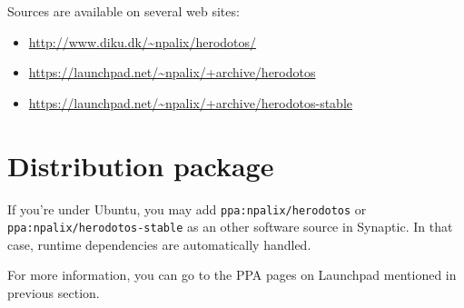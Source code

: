 Sources are available on several web sites:
\begin{itemize}
\item \url{http://www.diku.dk/~npalix/herodotos/}
\item \url{https://launchpad.net/~npalix/+archive/herodotos}
\item \url{https://launchpad.net/~npalix/+archive/herodotos-stable}
\end{itemize}

\section{Distribution package}
\label{sec:distro-package}

If you're under Ubuntu, you may add \texttt{ppa:npalix/herodotos} or
\texttt{ppa:npalix/herodotos-stable} as an other software source in
Synaptic. In that case, runtime dependencies are automatically
handled.

For more information, you can go to the PPA pages on Launchpad
mentioned in previous section.

